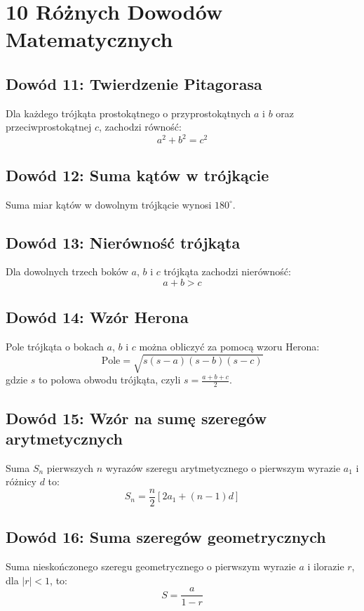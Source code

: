 \documentclass{article}
\begin{document}
\section*{10 Różnych Dowodów Matematycznych}

\subsection*{Dowód 11: Twierdzenie Pitagorasa}

Dla każdego trójkąta prostokątnego o przyprostokątnych \(a\) i \(b\) oraz przeciwprostokątnej \(c\), zachodzi równość:
\[ a^2 + b^2 = c^2 \]

\subsection*{Dowód 12: Suma kątów w trójkącie}

Suma miar kątów w dowolnym trójkącie wynosi \(180^\circ\).

\subsection*{Dowód 13: Nierówność trójkąta}

Dla dowolnych trzech boków \(a\), \(b\) i \(c\) trójkąta zachodzi nierówność:
\[ a + b > c \]

\subsection*{Dowód 14: Wzór Herona}

Pole trójkąta o bokach \(a\), \(b\) i \(c\) można obliczyć za pomocą wzoru Herona:
\[ \text{Pole} = \sqrt{s(s-a)(s-b)(s-c)} \]
gdzie \(s\) to połowa obwodu trójkąta, czyli \(s = \frac{a+b+c}{2}\).

\subsection*{Dowód 15: Wzór na sumę szeregów arytmetycznych}

Suma \(S_n\) pierwszych \(n\) wyrazów szeregu arytmetycznego o pierwszym wyrazie \(a_1\) i różnicy \(d\) to:
\[ S_n = \frac{n}{2}[2a_1 + (n-1)d] \]

\subsection*{Dowód 16: Suma szeregów geometrycznych}

Suma nieskończonego szeregu geometrycznego o pierwszym wyrazie \(a\) i ilorazie \(r\), dla \(|r| < 1\), to:
\[ S = \frac{a}{1-r} \]
\end{document}
